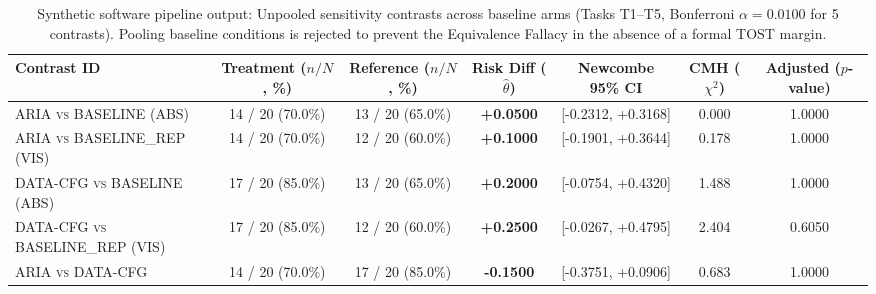 \documentclass[conference]{IEEEtran}
\begin{document}
\begin{table}[ht]
\centering
\small
\caption{Synthetic software pipeline output: Unpooled sensitivity contrasts across baseline arms (Tasks T1--T5, Bonferroni $\alpha = 0.0100$ for 5 contrasts). Pooling baseline conditions is rejected to prevent the Equivalence Fallacy in the absence of a formal TOST margin.}
\label{tab:synth1}
\begin{tabular*}{\textwidth}{@{\extracolsep{\fill}}lcccccc@{}}
\toprule
\textbf{Contrast ID} & \shortstack{\textbf{Treatment} \\ \scriptsize($n/N$, \%)} & \shortstack{\textbf{Reference} \\ \scriptsize($n/N$, \%)} & \shortstack{\textbf{Risk Diff} \\ \scriptsize($\hat{\theta}$)} & \textbf{Newcombe 95\% CI} & \shortstack{\textbf{CMH} \\ \scriptsize($\chi^2$)} & \shortstack{\textbf{Adjusted} \\ \scriptsize($p$-value)} \\
\midrule
\textsc{ARIA vs BASELINE (ABS)}          & 14 / 20 (70.0\%) & 13 / 20 (65.0\%) & \textbf{+0.0500} & [-0.2312, +0.3168] & 0.000 & 1.0000 \\
\textsc{ARIA vs BASELINE\_REP (VIS)}      & 14 / 20 (70.0\%) & 12 / 20 (60.0\%) & \textbf{+0.1000} & [-0.1901, +0.3644] & 0.178 & 1.0000 \\
\textsc{DATA-CFG vs BASELINE (ABS)}      & 17 / 20 (85.0\%) & 13 / 20 (65.0\%) & \textbf{+0.2000} & [-0.0754, +0.4320] & 1.488 & 1.0000 \\
\textsc{DATA-CFG vs BASELINE\_REP (VIS)}  & 17 / 20 (85.0\%) & 12 / 20 (60.0\%) & \textbf{+0.2500} & [-0.0267, +0.4795] & 2.404 & 0.6050 \\
\textsc{ARIA vs DATA-CFG}               & 14 / 20 (70.0\%) & 17 / 20 (85.0\%) & \textbf{-0.1500} & [-0.3751, +0.0906] & 0.683 & 1.0000 \\
\bottomrule
\end{tabular*}
\end{table}
\end{document}
